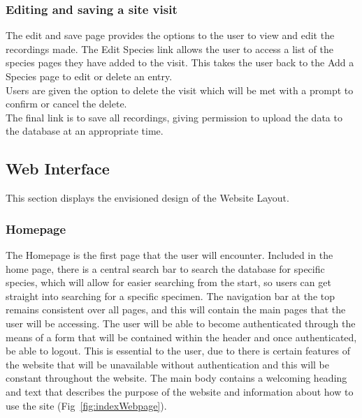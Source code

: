     \subsubsection{Editing and saving a site visit}
        The edit and save page provides the options to the user to view and edit the recordings made. The Edit Species link allows the user to access a list of the species pages they have added to the visit. This takes the user back to the Add a Species page to edit or delete an entry.\\
        
        Users are given the option to delete the visit which will be met with a prompt to confirm or cancel the delete.\\

        The final link is to save all recordings, giving permission to upload the data to the database at an appropriate time.\\
        
    \subsection{Web Interface}
        This section displays the envisioned design of the Website Layout.

        \subsubsection{Homepage}
           The Homepage is the first page that the user will encounter. Included in the home page, there is a central search bar to search the database for specific species, which will allow for easier searching from the start, so users can get straight into searching for a specific specimen. The navigation bar at the top remains consistent over all pages, and this will contain the main pages that the user will be accessing. The user will be able to become authenticated through the means of a form that will be contained within the header and once authenticated, be able to logout. This is essential to the user, due to there is certain features of the website that will be unavailable without authentication and this will be constant throughout the website. The main body contains a welcoming heading and text that describes the purpose of the website and information about how to use the site (Fig~\ref{fig:indexWebpage}).

